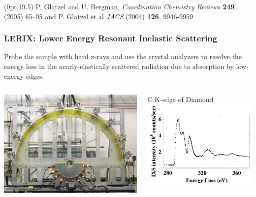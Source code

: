 \documentclass[10pt, xcolor=x11names, compress]{beamer}
\begin{document}
\begin{frame}
  \begin{textblock*}{0.6\linewidth}(0pt,19.5\TPVertModule)
    \tiny
    P. Glatzel and U. Bergman, \textit{Coordination Chemistry Reviews}
    \textbf{249} (2005) 65–95 and P. Glatzel et al \textit{JACS}
    (2004) \textbf{126}, 9946-9959
  \end{textblock*}
\end{frame}

\begin{frame}
  \frametitle{LERIX: Lower Energy Resonant Inelastic Scattering}

  Probe the sample with hard x-rays and use the crystal analyzers to
  resolve the energy loss in the nearly-elastically scattered
  radiation due to absorption by low-energy edges.

  \medskip

  \begin{columns}
    \begin{column}{0.5\linewidth}
      \includegraphics[width=0.9\linewidth]{pses/lerix/instrument.png}
    \end{column}
    \begin{column}{0.5\linewidth}
      \qquad C K-edge of Diamond\\
      \includegraphics[width=0.9\linewidth]{pses/lerix/diamond.png}      
    \end{column}
  \end{columns}


\end{frame}
\end{document}
